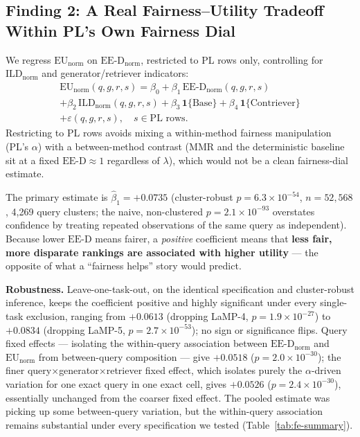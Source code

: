 \documentclass[11pt]{article}
\newcommand{\eed}{\ensuremath{\mathrm{EE\text{-}D}}}
\newcommand{\eunorm}{\ensuremath{\mathrm{EU}_{\mathrm{norm}}}}
\newcommand{\eednorm}{\ensuremath{\eed_{\mathrm{norm}}}}
\newcommand{\ild}{\ensuremath{\mathrm{ILD}}}
\newcommand{\ildnorm}{\ensuremath{\ild_{\mathrm{norm}}}}
\begin{document}
\subsection{Finding 2: A Real Fairness--Utility Tradeoff Within PL's Own Fairness Dial}
\label{sec:finding2}

We regress \eunorm{} on \eednorm{}, restricted to PL rows only, controlling
for \ildnorm{} and generator/retriever indicators:
\begin{multline}
\eunorm(q,g,r,s) = \beta_0 + \beta_1\,\eednorm(q,g,r,s) \\
+ \beta_2\,\ildnorm(q,g,r,s)
+ \beta_3\,\mathbf{1}\{\text{Base}\} + \beta_4\,\mathbf{1}\{\text{Contriever}\} \\
+ \varepsilon(q,g,r,s), \quad s \in \text{PL rows}.
\label{eq:finding2}
\end{multline}
Restricting to PL rows avoids mixing a within-method fairness manipulation
(PL's $\alpha$) with a between-method contrast (MMR and the deterministic
baseline sit at a fixed $\eed\approx1$ regardless of $\lambda$), which
would not be a clean fairness-dial estimate.

The primary estimate is $\hat\beta_1 = +0.0735$ (cluster-robust
$p=6.3\times10^{-54}$, $n=52{,}568$, 4{,}269 query clusters; the naive,
non-clustered $p=2.1\times10^{-93}$ overstates confidence by treating
repeated observations of the same query as independent). Because lower
\eed{} means fairer, a \emph{positive} coefficient means that
\textbf{less fair, more disparate rankings are associated with higher
utility} --- the opposite of what a ``fairness helps'' story would
predict.

\textbf{Robustness.} Leave-one-task-out, on the identical specification
and cluster-robust inference, keeps the coefficient positive and highly
significant under every single-task exclusion, ranging from $+0.0613$
(dropping LaMP-4, $p=1.9\times10^{-27}$) to $+0.0834$ (dropping LaMP-5,
$p=2.7\times10^{-53}$); no sign or significance flips. Query fixed effects
--- isolating the within-query association between \eednorm{} and
\eunorm{} from between-query composition --- give $+0.0518$
($p=2.0\times10^{-30}$); the finer query$\times$generator$\times$retriever
fixed effect, which isolates purely the $\alpha$-driven variation for one
exact query in one exact cell, gives $+0.0526$ ($p=2.4\times10^{-30}$),
essentially unchanged from the coarser fixed effect. The pooled estimate
was picking up some between-query variation, but the within-query
association remains substantial under every specification we tested
(Table~\ref{tab:fe-summary}).
\end{document}
